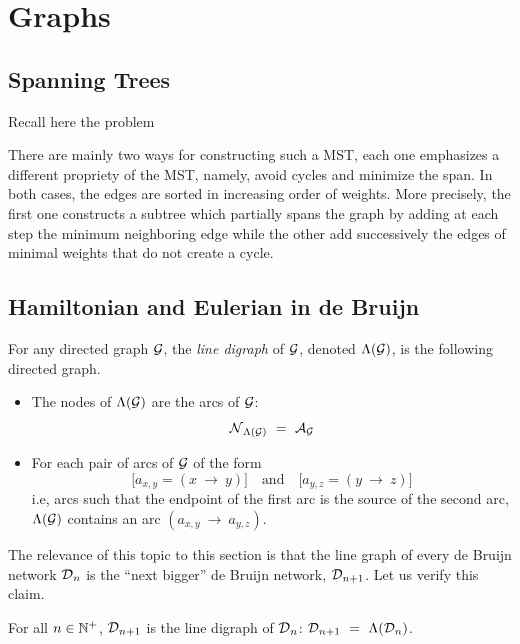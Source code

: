 
\section{Graphs}

\subsection{Spanning Trees}
\label{Appendix:spanningTrees}

Recall here the problem
\bigskip

There are mainly two ways for constructing such a MST, each one
emphasizes a different propriety of the MST, namely, avoid cycles and
minimize the span.  In both cases, the edges are sorted in increasing
order of weights.  More precisely, the first one constructs a subtree
which partially spans the graph by adding at each step the minimum
neighboring edge while the other add successively the edges of minimal
weights that do not create a cycle.

\subsection{Hamiltonian and Eulerian in de Bruijn}
\label{Appendix:hamiltonianDeBruijn}

%
For any directed graph $\mbox{$\cal G$}$, the {\it line digraph} 
 of $\mbox{$\cal G$}$, denoted $\Lambda(\mbox{$\cal G$})$, is the following
directed graph.
\begin{itemize}
\item
The nodes of $\Lambda(\mbox{$\cal G$})$ are the arcs of $\mbox{$\cal G$}$:
\[ \n_{{\Lambda}({\cal G})} \ = \ \a_{\fg} \]
\item
For each pair of arcs of $\mbox{$\cal G$}$ of the form
\[ \big[a_{x,y} = (x \ \rightarrow \ y) \big] \ \ \ \mbox{ and } \ \ \ 
\big[a_{y,z} = (y \ \rightarrow \ z) \big]
\]
i.e, arcs such that the endpoint of the first arc is the source of the
second arc, $\Lambda(\mbox{$\cal G$})$ contains an arc $(a_{x,y} \ \rightarrow
\ a_{y,z})$.
\end{itemize}
The relevance of this topic to this section is that the line graph of
every de Bruijn network $\mbox{$\cal D$}_n$ is the ``next bigger'' de Bruijn
network, $\mbox{$\cal D$}_{n+1}$.  Let us verify this claim.

\begin{prop}
\label{thm:deBruin-linegraph}
For all $n \in \mathbb{N}^+$,
$\mbox{$\cal D$}_{n+1}$ is the line digraph of $\mbox{$\cal D$}_n$: $\d_{n+1} \ = \ \Lambda(\d_n)$.
\end{prop}

